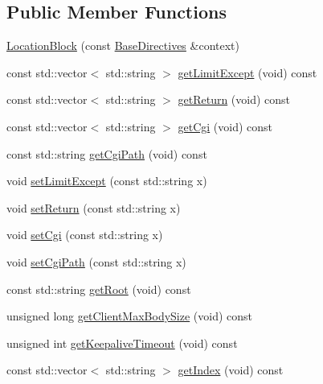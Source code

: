 \subsection*{Public Member Functions}
\begin{DoxyCompactItemize}
\item 
\hyperlink{classft_1_1_location_block_a28cbc9fd5dfde06685c8f7be5b6e0a4a}{Location\+Block} (const \hyperlink{classft_1_1_base_directives}{Base\+Directives} \&context)
\item 
const std\+::vector$<$ std\+::string $>$ \hyperlink{classft_1_1_location_block_ad2dc75d3f9c9f06f31e3948823557d52}{get\+Limit\+Except} (void) const
\item 
const std\+::vector$<$ std\+::string $>$ \hyperlink{classft_1_1_location_block_aeef5e4710c02406c46e54d4aa0c8f57c}{get\+Return} (void) const
\item 
const std\+::vector$<$ std\+::string $>$ \hyperlink{classft_1_1_location_block_adc8c829b27e09893233983eb1c727755}{get\+Cgi} (void) const
\item 
const std\+::string \hyperlink{classft_1_1_location_block_a9f90dac2d6314b77ccb9c9d4ab2a3fa4}{get\+Cgi\+Path} (void) const
\item 
void \hyperlink{classft_1_1_location_block_a307df676bb22688bb58396dd2c457848}{set\+Limit\+Except} (const std\+::string x)
\item 
void \hyperlink{classft_1_1_location_block_a041d07c701e052b114ef353d5e588998}{set\+Return} (const std\+::string x)
\item 
void \hyperlink{classft_1_1_location_block_a925a8d17e78d0cdea1b660e46e7be203}{set\+Cgi} (const std\+::string x)
\item 
void \hyperlink{classft_1_1_location_block_a25189c8c38f0b9ec831bb1b5295669c3}{set\+Cgi\+Path} (const std\+::string x)
\item 
const std\+::string \hyperlink{classft_1_1_base_directives_aa5dbcb08bda0a0e7e502d2df7cf64287}{get\+Root} (void) const
\item 
unsigned long \hyperlink{classft_1_1_base_directives_a930398ba1e4b99b2ba01a60dcda0c923}{get\+Client\+Max\+Body\+Size} (void) const
\item 
unsigned int \hyperlink{classft_1_1_base_directives_ab8574338758f65325cab5d1c394826c8}{get\+Keepalive\+Timeout} (void) const
\item 
const std\+::vector$<$ std\+::string $>$ \hyperlink{classft_1_1_base_directives_a018f34a5ffd66e891494b5c0ee69177b}{get\+Index} (void) const
\item 

\end{DoxyCompactItemize}
